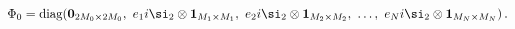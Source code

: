 \begin{equation}
\Phi _{0}={\mbox {diag}}({\bf 0}_{2M_{0}\times 2M_{0}},\ e_{1}i\si%
_{2}\otimes {\bf 1}_{M_{1}\times M_{1}},\ e_{2}i\si_{2}\otimes {\bf 1}%
_{M_{2}\times M_{2}},\ \ldots ,\ e_{N}i\si_{2}\otimes {\bf 1}_{M_{N}\times
M_{N}})\,.  \label{VAC}
\end{equation}

